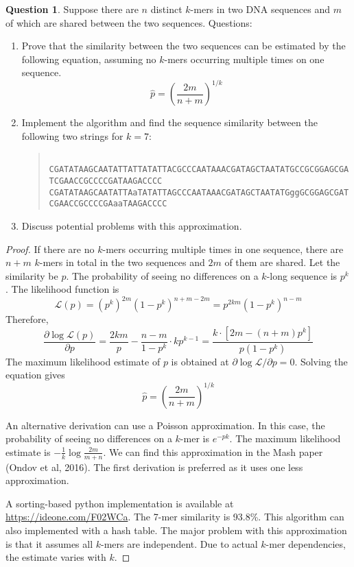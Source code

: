 \documentclass{article}[10pt]
\theoremstyle{definition}\newtheorem{question}{Question}
\begin{document}
\begin{question}
Suppose there are $n$ distinct $k$-mers in two DNA sequences and $m$ of which are
shared between the two sequences. Questions:
\begin{enumerate}
\item Prove that the similarity between the two sequences can be estimated by
the following equation, assuming no $k$-mers occurring multiple times on one
sequence.
$$
\hat{p}=\left(\frac{2m}{n+m}\right)^{1/k}
$$
\item Implement the algorithm and find the sequence similarity between the following two strings for $k=7$:
\begin{quote}
\footnotesize\tt
CGATATAAGCAATATTATTATATTACGCCCAATAAACGATAGCTAATATGCCGCGGAGCGATCGAACCGCCCCGATAAGACCCC\\
CGATATAAGCAATATTAaTATATTAGCCCAATAAACGATAGCTAATATGggGCGGAGCGATCGAACCGCCCCGAaaTAAGACCCC
\end{quote}
\item Discuss potential problems with this approximation.
\end{enumerate}
\end{question}

\begin{proof}
If there are no $k$-mers occurring multiple times in one sequence, there are
$n+m$ $k$-mers in total in the two sequences and $2m$ of them are shared.
Let the similarity be $p$. The probability of seeing no differences on a
$k$-long sequence is $p^k$. The likelihood function is
$$
\mathcal{L}(p)=\left(p^k\right)^{2m}\left(1-p^k\right)^{n+m-2m}=p^{2km}\left(1-p^k\right)^{n-m}
$$
Therefore,
$$
\frac{\partial\log\mathcal{L}(p)}{\partial p}=\frac{2km}{p}-\frac{n-m}{1-p^k}\cdot kp^{k-1}=\frac{k\cdot\left[2m-(n+m)p^k\right]}{p\left(1-p^k\right)}
$$
The maximum likelihood estimate of $p$ is obtained at
$\partial\log\mathcal{L}/\partial p=0$. Solving the equation gives
$$
\hat{p}=\left(\frac{2m}{n+m}\right)^{1/k}
$$

An alternative derivation can use a Poisson approximation. In this case, the
probability of seeing no differences on a $k$-mer is $e^{-pk}$. The maximum
likelihood estimate is $-\frac{1}{k}\log\frac{2m}{m+n}$. We can find this
approximation in the Mash paper (Ondov et al, 2016). The first derivation is
preferred as it uses one less approximation.

A sorting-based python implementation is available at
\url{https://ideone.com/F02WCa}. The 7-mer
similarity is 93.8\%. This algorithm can also implemented with a hash table.
The major problem with this approximation is that it assumes all $k$-mers are
independent. Due to actual $k$-mer dependencies, the estimate varies with $k$.
\end{proof}
\end{document}
